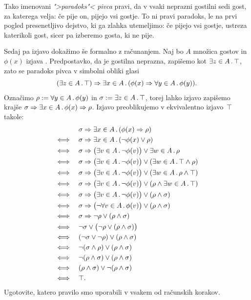 \begin{zgled}
  Tako imenovani \emph{">paradoks"< pivca} pravi, da v vsaki neprazni gostilni sedi gost, za katerega velja: če pije on, pijejo vsi gostje.
  To ni pravi paradoks, le na prvi pogled presenetljivo dejstvo, ki ga zlahka utemeljimo: če pijejo vsi gostje, ustreza katerikoli gost, sicer pa izberemo gosta, ki ne pije.

  Sedaj pa izjavo dokažimo še formalno z računanjem.
  Naj bo $A$ množica gostov in $\phi(x)$ izjava .
  Predpostavko, da je gostilna neprazna, zapišemo kot $\exists z \in A \,.\, \top$, zato se paradoks pivca v simbolni obliki glasi
  \begin{equation*}
    (\exists z \in A \,.\, \top) \Rightarrow \exists x \in A \,.\, (\phi(x) \Rightarrow \forall y \in A \,.\, \phi(y)).
  \end{equation*}
  Označimo $\rho \mathrel{{:}{=}} \forall y \in A \,.\, \phi(y)$ in $\sigma \mathrel{{:}{=}} \exists z \in A \,.\, \top$,
  torej lahko izjavo zapišemo krajše $\sigma \Rightarrow \exists x \in A \,.\, \phi(x) \Rightarrow \rho$.
  Izjavo preoblikujemo v ekvivalentno izjavo~$\top$ takole:
  \begin{align*}
    & \sigma \Rightarrow \exists x \in A \,.\, (\phi(x) \Rightarrow \rho) \\
    \iff\quad & \sigma \Rightarrow \exists x \in A \,.\, (\neg\phi(x) \lor \rho) \\
    \iff\quad & \sigma \Rightarrow \bigl(\exists v \in A \,.\, \neg\phi(v)\bigr) \lor \exists w \in A \,.\, \rho \\
    \iff\quad & \sigma \Rightarrow \bigl(\exists v \in A \,.\, \neg\phi(v)\bigr) \lor (\exists w \in A \,.\, \top \land \rho) \\
    \iff\quad & \sigma \Rightarrow \bigl(\exists v \in A \,.\, \neg\phi(v)\bigr) \lor (\exists w \in A \,.\, \rho \land \top) \\
    \iff\quad & \sigma \Rightarrow \bigl(\exists v \in A \,.\, \neg\phi(v)\bigr) \lor (\rho \land \exists w \in A \,.\, \top) \\
    \iff\quad & \sigma \Rightarrow \bigl(\exists v \in A \,.\, \neg\phi(v)\bigr) \lor (\rho \land \sigma) \\
    \iff\quad & \sigma \Rightarrow \bigl(\neg \forall v \in A \,.\, \phi(v)\bigr) \lor (\rho \land \sigma) \\
    \iff\quad & \sigma \Rightarrow \neg\rho \lor (\rho \land \sigma) \\
    \iff\quad & \neg\sigma \lor \bigl(\neg\rho \lor (\rho \land \sigma)\bigr) \\
    \iff\quad & (\neg\sigma \lor \neg\rho) \lor (\rho \land \sigma) \\
    \iff\quad & \neg(\sigma \land \rho) \lor (\rho \land \sigma) \\
    \iff\quad & \neg(\rho \land \sigma) \lor (\rho \land \sigma) \\
    \iff\quad & (\rho \land \sigma) \lor \neg(\rho \land \sigma) \\
    \iff\quad & \top.
  \end{align*}
  Ugotovite, katero pravilo smo uporabili v vsakem od računskih korakov.
\end{zgled}
